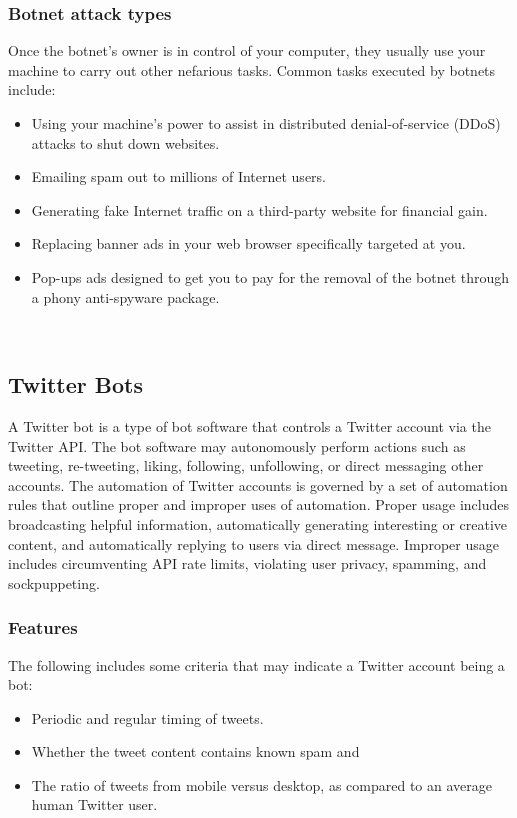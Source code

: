 \documentclass[a4paper, 12pt]{article}
\begin{document}
\subsubsection{Botnet attack types}
\par 
Once the botnet’s owner is in control of your computer, they usually use your machine to carry out other nefarious tasks. Common tasks executed by botnets include:
\begin{itemize}
    \item  Using your machine’s power to assist in distributed denial-of-service (DDoS) attacks to shut down websites.
    \item Emailing spam out to millions of Internet users.
    \item Generating fake Internet traffic on a third-party website for financial gain.
    \item Replacing banner ads in your web browser specifically targeted at you.
    \item Pop-ups ads designed to get you to pay for the removal of the botnet through a phony anti-spyware package.
\end{itemize}
\\

\subsection{Twitter Bots}
\par
\hspace{0.5cm}
A Twitter bot is a type of bot software that controls a Twitter account via the Twitter API. The bot software may autonomously perform actions such as tweeting, re-tweeting, liking, following, unfollowing, or direct messaging other accounts. The automation of Twitter accounts is governed by a set of automation rules that outline proper and improper uses of automation. Proper usage includes broadcasting helpful information, automatically generating interesting or creative content, and automatically replying to users via direct message. Improper usage includes circumventing API rate limits, violating user privacy, spamming, and sockpuppeting. 

\subsubsection{Features}
\par
The following includes some criteria that may indicate a Twitter account being a bot:
\begin{itemize}
    \item Periodic and regular timing of tweets.
    \item Whether the tweet content contains known spam and
    \item The ratio of tweets from mobile versus desktop, as compared to an average human Twitter user.
\end{itemize}
\end{document}

